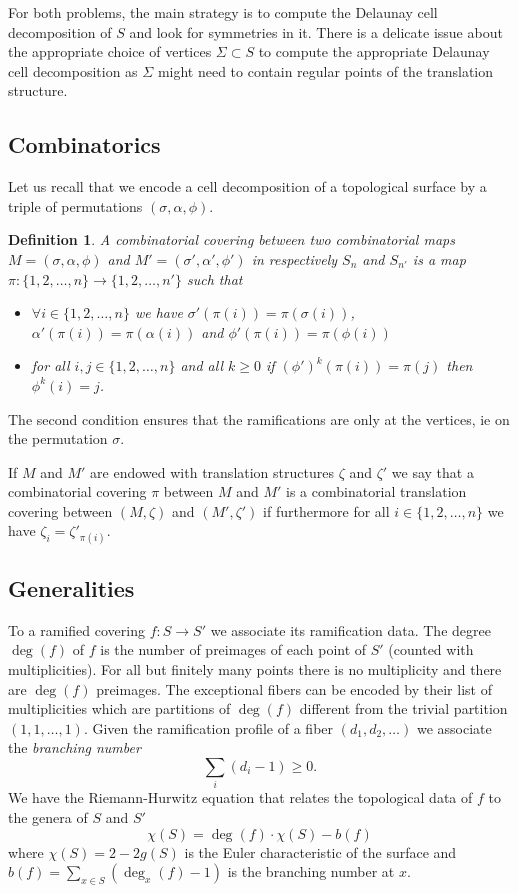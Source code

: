 \documentclass[a4paper,12pt]{article}
\newtheorem{definition}{Definition}
\begin{document}
For both problems, the main strategy is to compute the Delaunay cell
decomposition of $S$ and look for symmetries in it. There is a delicate
issue about the appropriate choice of vertices $\Sigma \subset S$ to
compute the appropriate Delaunay cell decomposition as $\Sigma$ might
need to contain regular points of the translation structure.

\subsection{Combinatorics}
Let us recall that we encode a cell decomposition of a topological surface by
a triple of permutations $(\sigma, \alpha, \phi)$.
\begin{definition}
A \emph{combinatorial covering}
between two combinatorial maps $M = (\sigma, \alpha, \phi)$ and
$M' = (\sigma', \alpha', \phi')$ in respectively $S_n$ and $S_{n'}$
is a map $\pi: \{1, 2, \ldots, n\} \to \{1, 2, \ldots, n'\}$ such that
\begin{itemize}
\item
$\forall i \in \{1,2,\ldots,n\}$ we have
$\sigma'(\pi(i)) = \pi(\sigma(i))$, $\alpha'(\pi(i)) = \pi(\alpha(i))$ and $\phi'(\pi(i)) = \pi(\phi(i))$
\item for all $i,j \in \{1,2,\ldots,n\}$ and all $k \geq 0$ if
$(\phi')^k(\pi(i)) = \pi(j)$ then $\phi^k(i) = j$.
\end{itemize}
\end{definition}
The second condition ensures that the ramifications are only at the vertices, ie
on the permutation $\sigma$.

If $M$ and $M'$ are endowed with translation structures $\zeta$ and $\zeta'$ we
say that a combinatorial covering $\pi$ between $M$ and $M'$ is a combinatorial
translation covering between $(M,\zeta)$ and $(M',\zeta')$ if furthermore
for all $i \in \{1,2,\ldots,n\}$ we have $\zeta_i = \zeta'_{\pi(i)}$.

\subsection{Generalities}
To a ramified covering $f: S \to S'$ we associate its ramification data.
The degree $\deg(f)$ of $f$ is the number of preimages of each point of $S'$
(counted with multiplicities). For all but finitely many points there is no
multiplicity and there are $\deg(f)$ preimages. The exceptional fibers can
be encoded by their list of multiplicities which are partitions of $\deg(f)$
different from the trivial partition $(1,1,\ldots,1)$. Given the ramification
profile of a fiber $(d_1, d_2, \ldots)$ we associate the \emph{branching number}
\[
\sum_{i} (d_i - 1) \geq 0.
\]
We have the Riemann-Hurwitz equation that relates
the topological data of $f$ to the genera of $S$ and $S'$
\begin{equation}
\label{eq:RiemannHurwitz}
\chi(S) = \deg(f) \cdot \chi(S) - b(f)
\end{equation}
where $\chi(S) = 2 - 2g(S)$ is the Euler characteristic of the surface
and $b(f) = \sum_{x \in S} (\deg_x(f) - 1)$ is the branching number at $x$.
\end{document}
